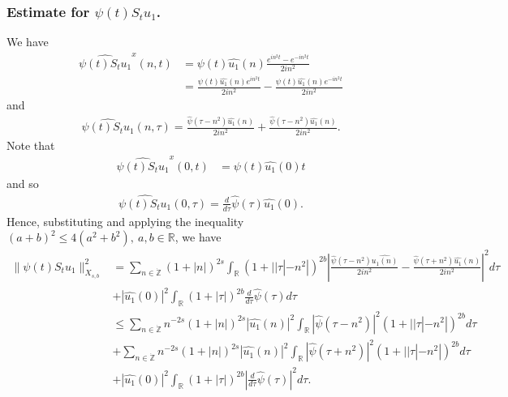 \documentclass[12pt,reqno]{amsart}
\numberwithin{equation}{section}  %
\numberwithin{figure}{section}
\newcommand{\rr}{\mathbb{R}}
\newcommand{\zz}{\mathbb{Z}}
\newcommand{\zzdot}{\dot{\zz}}
\newcommand{\wh}{\widehat}
\theoremstyle{plain}
\theoremstyle{definition}
\theoremstyle{remark}
\begin{document}
\subsubsection{Estimate for $\psi(t) S_{t}u_{1}$.}
\label{sssec:estimate-init-term-2}
We have
%
%
\begin{equation*}
  \begin{split}
    \wh{\psi(t)S_{t}u_{1}}^{x}(n, t)
    & = \psi(t) \wh{u_{1}}(n) \frac{e^{in^2 t} - e^{-in^{2}t}}{2i n^{2}}
    \\
    & = \frac{\psi(t) \wh{u_{1}}(n)e^{in^{2}t}}{2i n^{2}} - \frac{\psi(t)
    \wh{u_{1}}(n)e^{-in^{2}t}}{2i n^{2}}  
  \end{split}
\end{equation*}
%
%
and
%
%
\begin{equation*}
  \begin{split}
    \wh{\psi(t) S_{t}u_{1}}(n, \tau) = \frac{\wh{\psi}(\tau -
    n^{2})\wh{u_{1}}(n)}{2i n^{2}} + \frac{\wh{\psi}(\tau - n^{2})\wh{u_{1}}(n)}{2i
    n^{2}}.
  \end{split}
\end{equation*}
%
Note that 
%
\begin{equation*}
  \begin{split}
    \wh{\psi(t)S_{t}u_{1}}^{x}(0, t)
    & = \psi(t) \wh{u_{1}}(0) t
      \end{split}
\end{equation*}
and so 
%
%
\begin{equation*}
  \begin{split}
    \wh{\psi(t) S_{t}u_{1}}(0, \tau) = \frac{d}{d \tau} \wh{\psi}(\tau)
    \wh{u_{1}}(0).
  \end{split}
\end{equation*}
%
Hence, substituting and applying the inequality $(a + b)^{2} \le 4(a^{2} +
b^{2}),\ a, b \in \rr$, we have
%
%
\begin{equation}
  \begin{split}
    \| \psi(t) S_{t}u_{1} \|_{X_{s,b}}^{2} 
    & = \sum_{n \in \zzdot}(1 + |n|)^{2s} \int_{\rr}\left( 1 + | | \tau
    |-n^{2} | \right)^{2b} | \frac{\wh{\psi}(\tau - n^{2})\wh{u_{1}(n)}}{2i
    n^{2}} -
    \frac{\wh{\psi}(\tau + n^{2})\wh{u_{1}}(n)}{2i n^{2}} |^{2} d \tau
    \\
    & + |\wh{u_{1}}(0)|^{2} \int_{\rr} (1 + | \tau |)^{2b} \frac{d }{d \tau}
    \wh{\psi}(\tau) d \tau
    \\
    & \le \sum_{n \in \dot{\zz}} n^{-2s} \left( 1 + |n| \right)^{2s} | \wh{u_{1}}(n)
    |^{2} \int_{\rr} | \wh{\psi}(\tau - n^{2}) |^{2}\left( 1 + | | \tau | -
    n^{2} | \right)^{2b} d \tau
    \\
    & + \sum_{n \in \dot{\zz}} n^{-2s} \left( 1 + |n| \right)^{2s} | \wh{u_{1}}(n)
    |^{2} \int_{\rr} | \wh{\psi}(\tau + n^{2}) |^{2}\left( 1 + | | \tau | -
    n^{2} | \right)^{2b} d \tau
    \\
    & + |\wh{u_{1}}(0)|^{2} \int_{\rr} (1 + | \tau |)^{2b} |\frac{d }{d \tau}
    \wh{\psi}(\tau)|^2 d \tau.
\end{split}
\label{u-1-norm-comp-pre}
\end{equation}
\end{document}
